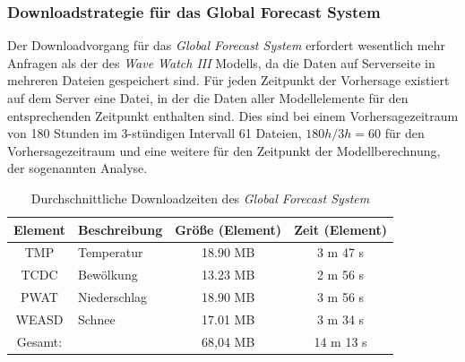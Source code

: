 \subsubsection{Downloadstrategie für das Global Forecast System}
Der Downloadvorgang für das \textit{Global Forecast System} erfordert
wesentlich mehr Anfragen als der des \textit{Wave Watch III} Modells,
da die Daten auf Serverseite in mehreren Dateien gespeichert sind. Für
jeden Zeitpunkt der Vorhersage existiert auf dem Server eine Datei, in
der die Daten aller Modellelemente für den entsprechenden Zeitpunkt
enthalten sind. Dies sind bei einem Vorhersagezeitraum von 180 Stunden
im 3-stündigen Intervall 61 Dateien, $180h / 3h = 60$ für den
Vorhersagezeitraum und eine weitere für den Zeitpunkt der
Modellberechnung, der sogenannten Analyse.

\begin{table}[h]
  \centering
  {\sf
    \footnotesize
    \begin{longtable}{@{}clcc}
      \toprule
      \textbf{Element} & \textbf{Beschreibung} & \textbf{Größe (Element)} & \textbf{Zeit (Element)} \\
      \midrule
      TMP   & Temperatur & 18.90 MB &  3 m 47 s \\
      TCDC  & Bewölkung & 13.23 MB &  2 m 56 s \\
      PWAT  & Niederschlag & 18.90 MB &  3 m 56 s \\
      WEASD & Schnee & 17.01 MB &  3 m 34 s \\
      \midrule
      Gesamt: & & 68,04 MB &  14 m 13 s \\
      \bottomrule
    \end{longtable}
  }
  \caption{Durchschnittliche Downloadzeiten des \textit{Global Forecast System}}
  \label{tab:download_messung_gfs}
\end{table}

